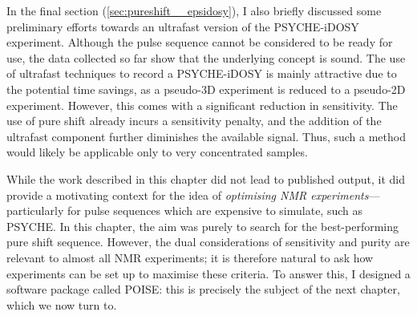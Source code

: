 In the final section (\cref{sec:pureshift__epsidosy}), I also briefly discussed some preliminary efforts towards an ultrafast version of the PSYCHE-iDOSY experiment\autocite{Foroozandeh2016ACIE}.
Although the pulse sequence cannot be considered to be ready for use, the data collected so far show that the underlying concept is sound.
The use of ultrafast techniques to record a PSYCHE-iDOSY is mainly attractive due to the potential time savings, as a pseudo-3D experiment is reduced to a pseudo-2D experiment.
However, this comes with a significant reduction in sensitivity.
The use of pure shift already incurs a sensitivity penalty, and the addition of the ultrafast component further diminishes the available signal.
Thus, such a method would likely be applicable only to very concentrated samples.

While the work described in this chapter did not lead to published output, it did provide a motivating context for the idea of \textit{optimising NMR experiments}---particularly for pulse sequences which are expensive to simulate, such as PSYCHE.
In this chapter, the aim was purely to search for the best-performing pure shift sequence.
However, the dual considerations of sensitivity and purity are relevant to almost all NMR experiments; it is therefore natural to ask how experiments can be set up to maximise these criteria.
To answer this, I designed a software package called POISE: this is precisely the subject of the next chapter, which we now turn to.
